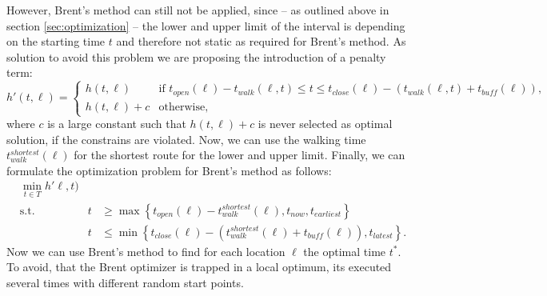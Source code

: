  However, Brent's method can still not be applied, since -- as outlined above in section \ref{sec:optimization} -- the lower and upper limit of the interval is depending on the starting time $t$ and therefore not static as required for Brent's method. As solution to avoid this problem we are proposing the introduction of a penalty term:
 \begin{equation}
 \label{eq:optimal-time-penality}
 h'(t,\ell) = \begin{cases}
 h(t,\ell) & \text{if }t_{open}(\ell)-t_{walk}(\ell,t) \leq t \leq  t_{close}(\ell)-(t_{walk}(\ell,t)+t_{buff}(\ell)),\\
 h(t,\ell)  + c & \text{otherwise,}
 \end{cases}
 \end{equation}
 where $c$ is a large constant such that $h(t,\ell) + c$ is never selected as optimal solution, if the constrains are violated. Now, we can use the walking time $t_{walk}^{shortest}(\ell)$  for the shortest route for the lower and upper limit. Finally, we can formulate the optimization problem for Brent's method as follows:
 \begin{subequations}
 	\label{eq:brent-optimization-problem}
 	\begin{alignat}{2}
 	&\min_{t \in T} h'\ell, t) && \\
 	&\text{s.t.} & t & \geq \max\left\lbrace  t_{open}(\ell)-t_{walk}^{shortest}(\ell), t_{now}, t_{earliest} \right\rbrace \\
 	& & t &\leq \min\left\lbrace  t_{close}(\ell)- \left(t_{walk}^{shortest}(\ell) + t_{buff}(\ell)\right), t_{latest} \right\rbrace.
 	\end{alignat}
 \end{subequations}
Now we can use Brent's method to find for each location $\ell$ the optimal time $t^*$. To avoid, that the Brent optimizer is trapped in a local optimum, its executed several times with different random start points.
